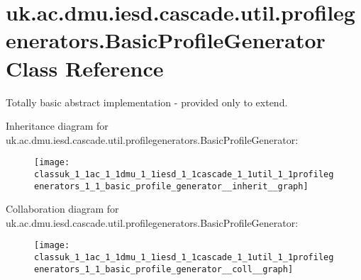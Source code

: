 \hypertarget{classuk_1_1ac_1_1dmu_1_1iesd_1_1cascade_1_1util_1_1profilegenerators_1_1_basic_profile_generator}{\section{uk.\-ac.\-dmu.\-iesd.\-cascade.\-util.\-profilegenerators.\-Basic\-Profile\-Generator Class Reference}
\label{classuk_1_1ac_1_1dmu_1_1iesd_1_1cascade_1_1util_1_1profilegenerators_1_1_basic_profile_generator}
}


Totally basic abstract implementation -\/ provided only to extend.  




Inheritance diagram for uk.\-ac.\-dmu.\-iesd.\-cascade.\-util.\-profilegenerators.\-Basic\-Profile\-Generator\-:\nopagebreak
\begin{figure}[H]
\begin{center}
\leavevmode
\texttt{[image: classuk\_1\_1ac\_1\_1dmu\_1\_1iesd\_1\_1cascade\_1\_1util\_1\_1profilegenerators\_1\_1\_basic\_profile\_generator\_\_inherit\_\_graph]}
\end{center}
\end{figure}


Collaboration diagram for uk.\-ac.\-dmu.\-iesd.\-cascade.\-util.\-profilegenerators.\-Basic\-Profile\-Generator\-:\nopagebreak
\begin{figure}[H]
\begin{center}
\leavevmode
\texttt{[image: classuk\_1\_1ac\_1\_1dmu\_1\_1iesd\_1\_1cascade\_1\_1util\_1\_1profilegenerators\_1\_1\_basic\_profile\_generator\_\_coll\_\_graph]}
\end{center}
\end{figure}
